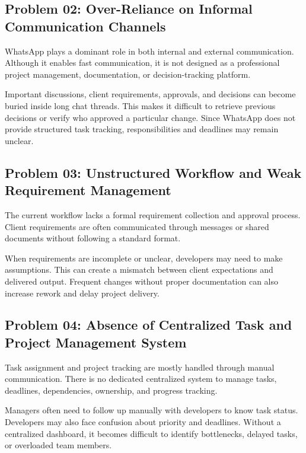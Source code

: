 \documentclass[12pt,a4paper]{report}
\begin{document}
\subsection{Problem 02: Over-Reliance on Informal Communication Channels}

\begin{problemBox}
WhatsApp plays a dominant role in both internal and external communication. Although it enables fast communication, it is not designed as a professional project management, documentation, or decision-tracking platform.
\end{problemBox}

Important discussions, client requirements, approvals, and decisions can become buried inside long chat threads. This makes it difficult to retrieve previous decisions or verify who approved a particular change. Since WhatsApp does not provide structured task tracking, responsibilities and deadlines may remain unclear.

\subsection{Problem 03: Unstructured Workflow and Weak Requirement Management}

\begin{problemBox}
The current workflow lacks a formal requirement collection and approval process. Client requirements are often communicated through messages or shared documents without following a standard format.
\end{problemBox}

When requirements are incomplete or unclear, developers may need to make assumptions. This can create a mismatch between client expectations and delivered output. Frequent changes without proper documentation can also increase rework and delay project delivery.

\subsection{Problem 04: Absence of Centralized Task and Project Management System}

\begin{problemBox}
Task assignment and project tracking are mostly handled through manual communication. There is no dedicated centralized system to manage tasks, deadlines, dependencies, ownership, and progress tracking.
\end{problemBox}

Managers often need to follow up manually with developers to know task status. Developers may also face confusion about priority and deadlines. Without a centralized dashboard, it becomes difficult to identify bottlenecks, delayed tasks, or overloaded team members.
\end{document}
